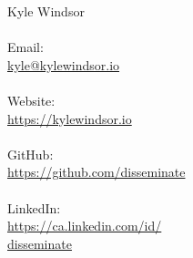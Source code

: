 
\begin{minipage}[t]{0.25\hsize} %
	{\huge Kyle Windsor}\\
	{\color{contact}
	\\
	Email:\\
	\href{mailto:kyle@kylewindsor.io}{kyle@kylewindsor.io}\\
	\\
	Website:\\
	\href{https://kylewindsor.io}{https://kylewindsor.io}\\
	\\
	GitHub:\\
	\href{https://github.com/disseminate/}{https://github.com/disseminate}\\
	\\
	LinkedIn:\\
	\href{https://ca.linkedin.com/in/disseminate}{https://ca.linkedin.com/id/\\disseminate}\\
	\\
	}
\end{minipage}
